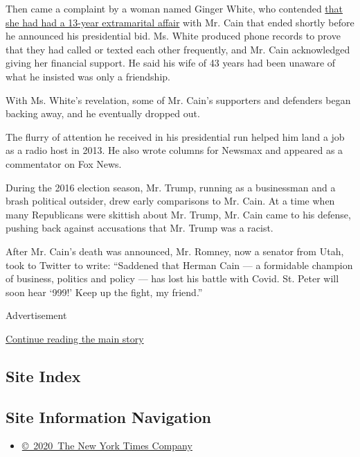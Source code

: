 Then came a complaint by a woman named Ginger White, who contended
\href{https://www.nytimes.com/2011/11/29/us/politics/cain-accused-of-affair-by-ginger-white.html}{that
she had had a 13-year extramarital affair} with Mr. Cain that ended
shortly before he announced his presidential bid. Ms. White produced
phone records to prove that they had called or texted each other
frequently, and Mr. Cain acknowledged giving her financial support. He
said his wife of 43 years had been unaware of what he insisted was only
a friendship.

With Ms. White's revelation, some of Mr. Cain's supporters and defenders
began backing away, and he eventually dropped out.

The flurry of attention he received in his presidential run helped him
land a job as a radio host in 2013. He also wrote columns for Newsmax
and appeared as a commentator on Fox News.

During the 2016 election season, Mr. Trump, running as a businessman and
a brash political outsider, drew early comparisons to Mr. Cain. At a
time when many Republicans were skittish about Mr. Trump, Mr. Cain came
to his defense, pushing back against accusations that Mr. Trump was a
racist.

After Mr. Cain's death was announced, Mr. Romney, now a senator from
Utah, took to Twitter to write: ``Saddened that Herman Cain --- a
formidable champion of business, politics and policy --- has lost his
battle with Covid. St. Peter will soon hear `999!' Keep up the fight, my
friend.''

Advertisement

\protect\hyperlink{after-bottom}{Continue reading the main story}

\hypertarget{site-index}{%
\subsection{Site Index}\label{site-index}}

\hypertarget{site-information-navigation}{%
\subsection{Site Information
Navigation}\label{site-information-navigation}}

\begin{itemize}
\tightlist
\item
  \href{https://help.nytimes.com/hc/en-us/articles/115014792127-Copyright-notice}{©~2020~The
  New York Times Company}
\end{itemize}


